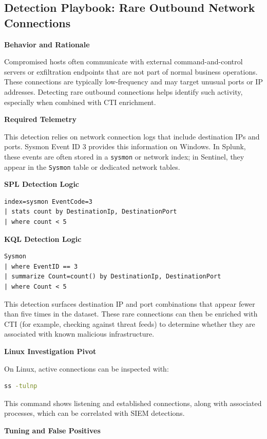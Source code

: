 \subsection*{Detection Playbook: Rare Outbound Network Connections}

\textbf{Behavior and Rationale}

Compromised hosts often communicate with external command-and-control servers or exfiltration endpoints that are 
not part of normal business operations. These connections are typically low-frequency and may target unusual 
ports or IP addresses. Detecting rare outbound connections helps identify such activity, especially when combined with CTI enrichment.

\textbf{Required Telemetry}

This detection relies on network connection logs that include destination IPs and ports. Sysmon Event ID 3 provides 
this information on Windows. In Splunk, these events are often stored in a \texttt{sysmon} or network index; in Sentinel, 
they appear in the \texttt{Sysmon} table or dedicated network tables.

\textbf{SPL Detection Logic}
\begin{lstlisting}
index=sysmon EventCode=3
| stats count by DestinationIp, DestinationPort
| where count < 5
\end{lstlisting}

\textbf{KQL Detection Logic}
\begin{lstlisting}
Sysmon
| where EventID == 3
| summarize Count=count() by DestinationIp, DestinationPort
| where Count < 5
\end{lstlisting}

This detection surfaces destination IP and port combinations that appear fewer than five times in the dataset. 
These rare connections can then be enriched with CTI (for example, checking against threat feeds) to determine whether 
they are associated with known malicious infrastructure.

\textbf{Linux Investigation Pivot}

On Linux, active connections can be inspected with:

\begin{lstlisting}[language=bash]
ss -tulnp
\end{lstlisting}

This command shows listening and established connections, along with associated processes, which can be correlated with SIEM detections.

\textbf{Tuning and False Positives}


